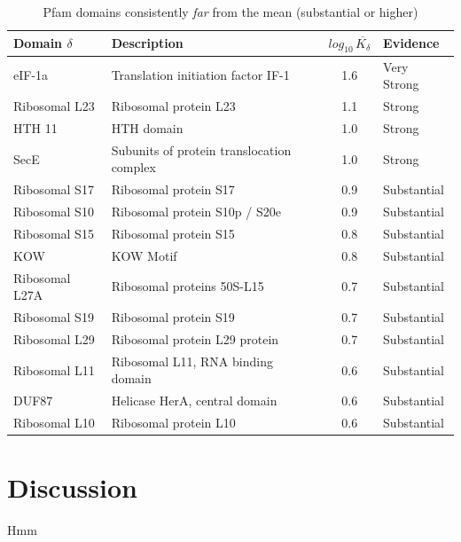\documentclass[12pt]{article}
\begin{document}
\begin{table}[!h]
	\centering
	\hspace*{-1.2cm}
    \begin{tabular}{l l c l}
        \toprule
        Domain $\delta$ & Description & $log_{10}\,\overline{K_{\delta}}$ & Evidence \\
        \midrule
        eIF-1a & Translation initiation factor IF-1 & 1.6 & Very Strong \\
        Ribosomal L23 & Ribosomal protein L23 & 1.1 & Strong \\
        HTH 11 & HTH domain & 1.0 & Strong \\
        SecE & Subunits of protein translocation complex & 1.0 & Strong \\
        Ribosomal S17 & Ribosomal protein S17 & 0.9 & Substantial \\
        Ribosomal S10 & Ribosomal protein S10p / S20e & 0.9 & Substantial \\
        Ribosomal S15 & Ribosomal protein S15 & 0.8 & Substantial \\
        KOW & KOW Motif & 0.8 & Substantial \\
        Ribosomal L27A & Ribosomal proteins 50S-L15 & 0.7 & Substantial \\
        Ribosomal S19 & Ribosomal protein S19 & 0.7 & Substantial \\
        Ribosomal L29 & Ribosomal protein L29 protein & 0.7 & Substantial \\
        Ribosomal L11 & Ribosomal L11, RNA binding domain & 0.6 & Substantial \\
        DUF87 & Helicase HerA, central domain & 0.6 & Substantial \\
        Ribosomal L10 & Ribosomal protein L10 & 0.6 & Substantial \\
        \bottomrule
    \end{tabular}
    \caption{Pfam domains consistently \textit{far} from the mean (substantial or higher)}
    \label{table:pfam_right_overall}
\end{table}

\section{Discussion}

Hmm

\pagebreak



\end{document}
